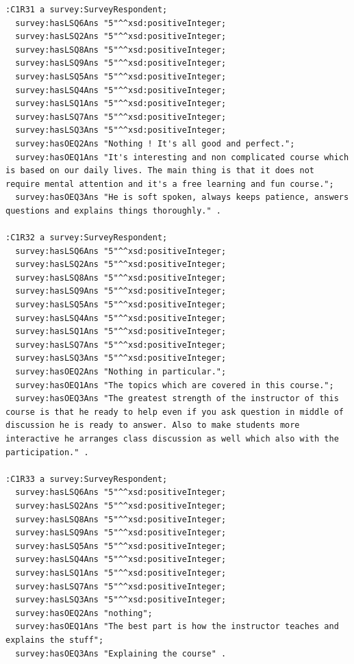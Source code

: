 \begin{lstlisting}
:C1R31 a survey:SurveyRespondent;
  survey:hasLSQ6Ans "5"^^xsd:positiveInteger;
  survey:hasLSQ2Ans "5"^^xsd:positiveInteger;
  survey:hasLSQ8Ans "5"^^xsd:positiveInteger;
  survey:hasLSQ9Ans "5"^^xsd:positiveInteger;
  survey:hasLSQ5Ans "5"^^xsd:positiveInteger;
  survey:hasLSQ4Ans "5"^^xsd:positiveInteger;
  survey:hasLSQ1Ans "5"^^xsd:positiveInteger;
  survey:hasLSQ7Ans "5"^^xsd:positiveInteger;
  survey:hasLSQ3Ans "5"^^xsd:positiveInteger;
  survey:hasOEQ2Ans "Nothing ! It's all good and perfect.";
  survey:hasOEQ1Ans "It's interesting and non complicated course which is based on our daily lives. The main thing is that it does not require mental attention and it's a free learning and fun course.";
  survey:hasOEQ3Ans "He is soft spoken, always keeps patience, answers questions and explains things thoroughly." .

:C1R32 a survey:SurveyRespondent;
  survey:hasLSQ6Ans "5"^^xsd:positiveInteger;
  survey:hasLSQ2Ans "5"^^xsd:positiveInteger;
  survey:hasLSQ8Ans "5"^^xsd:positiveInteger;
  survey:hasLSQ9Ans "5"^^xsd:positiveInteger;
  survey:hasLSQ5Ans "5"^^xsd:positiveInteger;
  survey:hasLSQ4Ans "5"^^xsd:positiveInteger;
  survey:hasLSQ1Ans "5"^^xsd:positiveInteger;
  survey:hasLSQ7Ans "5"^^xsd:positiveInteger;
  survey:hasLSQ3Ans "5"^^xsd:positiveInteger;
  survey:hasOEQ2Ans "Nothing in particular.";
  survey:hasOEQ1Ans "The topics which are covered in this course.";
  survey:hasOEQ3Ans "The greatest strength of the instructor of this course is that he ready to help even if you ask question in middle of discussion he is ready to answer. Also to make students more interactive he arranges class discussion as well which also with the participation." .

:C1R33 a survey:SurveyRespondent;
  survey:hasLSQ6Ans "5"^^xsd:positiveInteger;
  survey:hasLSQ2Ans "5"^^xsd:positiveInteger;
  survey:hasLSQ8Ans "5"^^xsd:positiveInteger;
  survey:hasLSQ9Ans "5"^^xsd:positiveInteger;
  survey:hasLSQ5Ans "5"^^xsd:positiveInteger;
  survey:hasLSQ4Ans "5"^^xsd:positiveInteger;
  survey:hasLSQ1Ans "5"^^xsd:positiveInteger;
  survey:hasLSQ7Ans "5"^^xsd:positiveInteger;
  survey:hasLSQ3Ans "5"^^xsd:positiveInteger;
  survey:hasOEQ2Ans "nothing";
  survey:hasOEQ1Ans "The best part is how the instructor teaches and explains the stuff";
  survey:hasOEQ3Ans "Explaining the course" .


\end{lstlisting}
